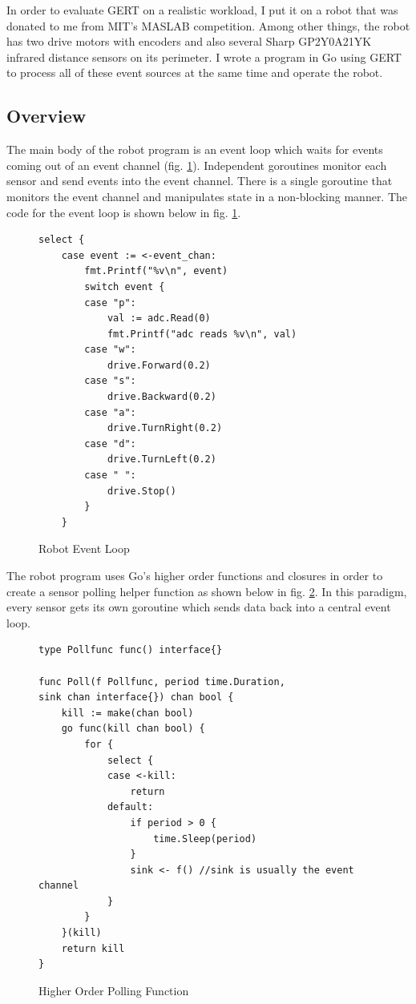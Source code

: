 In order to evaluate GERT on a realistic workload, I put it on a robot that was
donated to me from MIT's MASLAB competition. Among other things, the robot has two drive
motors with encoders and also several Sharp GP2Y0A21YK infrared distance sensors on its perimeter.
I wrote a program in Go using GERT to process all of these event sources at the same time
and operate the robot.

\subsection{Overview}
The main body of the robot program is an event loop which waits for events coming out of an event channel (fig. \ref{fig:event_loop}).
Independent goroutines monitor each sensor and send events into the event channel. There is a
single goroutine that monitors the event channel and manipulates state in a non-blocking manner. The code for the
event loop is shown below in fig. \ref{fig:event_loop}.

\begin{figure}[h]
  \begin{center}
\begin{lstlisting}
select {
	case event := <-event_chan:
		fmt.Printf("%v\n", event)
		switch event {
		case "p":
			val := adc.Read(0)
			fmt.Printf("adc reads %v\n", val)
		case "w":
			drive.Forward(0.2)
		case "s":
			drive.Backward(0.2)
		case "a":
			drive.TurnRight(0.2)
		case "d":
			drive.TurnLeft(0.2)
		case " ":
			drive.Stop()
		}
	}
\end{lstlisting}
\end{center}
  \caption{Robot Event Loop} \label{fig:event_loop}
\end{figure}

The robot program uses Go's higher order functions and closures in order to create a sensor polling helper function
as shown below in fig. \ref{fig:poll_func}. In this paradigm, every sensor gets its own goroutine which sends
data back into a central event loop.


\begin{figure}[!h]
\begin{center}
\begin{lstlisting}
type Pollfunc func() interface{}

func Poll(f Pollfunc, period time.Duration,
sink chan interface{}) chan bool {
	kill := make(chan bool)
	go func(kill chan bool) {
		for {
			select {
			case <-kill:
				return
			default:
				if period > 0 {
					time.Sleep(period)
				}
				sink <- f() //sink is usually the event channel
			}
		}
	}(kill)
	return kill
}
\end{lstlisting}
\end{center}
  \caption{Higher Order Polling Function} \label{fig:poll_func}
\end{figure}

